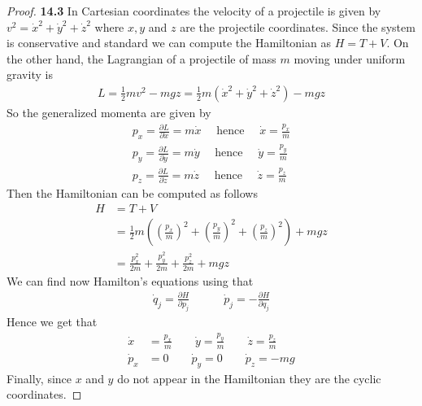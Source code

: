 \documentclass[11pt]{article}
\theoremstyle{definition}
\begin{document}
\begin{proof}{\textbf{14.3}}
    In Cartesian coordinates the velocity of a projectile is given by
    $v^2 = \dot{x}^2 + \dot{y}^2 + \dot{z}^2$ where $x,y$ and $z$ are the
    projectile coordinates. Since the system is conservative and standard
    we can compute the Hamiltonian as $H = T + V$.
    On the other hand, the Lagrangian of a projectile of mass $m$ moving
    under uniform gravity is
    \begin{align*}
        L = \frac{1}{2}mv^2 - mgz
        = \frac{1}{2}m(\dot{x}^2 + \dot{y}^2 + \dot{z}^2) - mgz
    \end{align*}
    So the generalized momenta are given by
    \begin{align*}
        p_x = \frac{\partial L}{\partial \dot{x}} = m\dot x
        \quad\text{ hence }\quad \dot x = \frac{p_x}{m}\\
        p_y = \frac{\partial L}{\partial \dot{y}} = m\dot y
        \quad\text{ hence }\quad \dot y = \frac{p_y}{m}\\
        p_z = \frac{\partial L}{\partial \dot{z}} = m\dot z
        \quad\text{ hence }\quad \dot z = \frac{p_z}{m}
    \end{align*}
    Then the Hamiltonian can be computed as follows
    \begin{align*}
        H &= T + V\\
        &= \frac{1}{2}m\left(
            \left(\frac{p_x}{m}\right)^2 +
            \left(\frac{p_y}{m}\right)^2 +
            \left(\frac{p_z}{m}\right)^2
        \right) + mgz\\
        &= \frac{p_x^2}{2m} + \frac{p_y^2}{2m} + \frac{p_z^2}{2m} + mgz
    \end{align*}
    We can find now Hamilton's equations using that
    \begin{align*}
        \dot{q}_j = \frac{\partial H}{\partial p_j} \quad\quad\quad
        \dot{p}_j = -\frac{\partial H}{\partial q_j}
    \end{align*}
    Hence we get that
    \begin{align*}
        \dot x &= \frac{p_x}{m} \quad\quad
        \dot y = \frac{p_y}{m} \quad\quad
        \dot z = \frac{p_z}{m}\\
        \dot p_x &= 0 \quad\quad
        \dot p_y = 0 \quad\quad
        \dot p_z = -mg        
    \end{align*}
    Finally, since $x$ and $y$ do not appear in the Hamiltonian they are the
    cyclic coordinates.
\end{proof}
\end{document}
